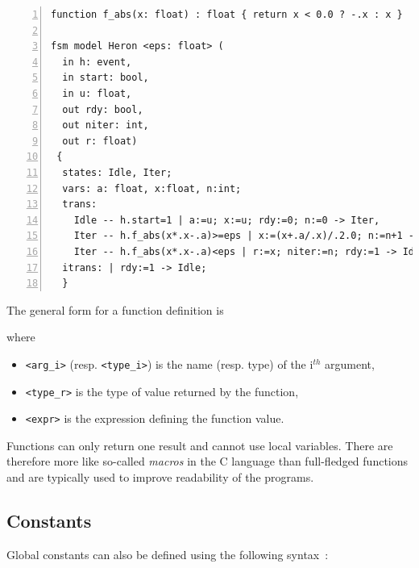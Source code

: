 \begin{lstlisting}[language=Rfsm,frame=single,numbers=left,caption=An RFSM program using a global
  function definition,label={lst:rfsm-heron},float]
function f_abs(x: float) : float { return x < 0.0 ? -.x : x }

fsm model Heron <eps: float> (
  in h: event, 
  in start: bool,
  in u: float,
  out rdy: bool,
  out niter: int,
  out r: float)
 {
  states: Idle, Iter;
  vars: a: float, x:float, n:int;
  trans:
    Idle -- h.start=1 | a:=u; x:=u; rdy:=0; n:=0 -> Iter,
    Iter -- h.f_abs(x*.x-.a)>=eps | x:=(x+.a/.x)/.2.0; n:=n+1 -> Iter,
    Iter -- h.f_abs(x*.x-.a)<eps | r:=x; niter:=n; rdy:=1 -> Idle;
  itrans: | rdy:=1 -> Idle;
  }
\end{lstlisting}

\medskip
\step The general form for a function definition is 

\begin{center}
\end{center}

\noindent
where
\begin{itemize}
\item \lstinline[language=Rfsm]|<arg_i>| (resp. \lstinline[language=Rfsm]|<type_i>|) is the name
  (resp. type) of the i$^{th}$ argument,
\item \lstinline[language=Rfsm]|<type_r>| is the type of value returned by the function,
\item \lstinline[language=Rfsm]|<expr>| is the expression defining the function value.
\end{itemize}

\medskip
\step Functions can only return one result and cannot use local variables. There are therefore more
like so-called \emph{macros} in the C language than full-fledged functions and are typically used to
improve readability of the programs.

\subsection{Constants}
\label{sec:constants}

Global constants can also be defined using the following syntax~:  

\begin{center}
\end{center}

